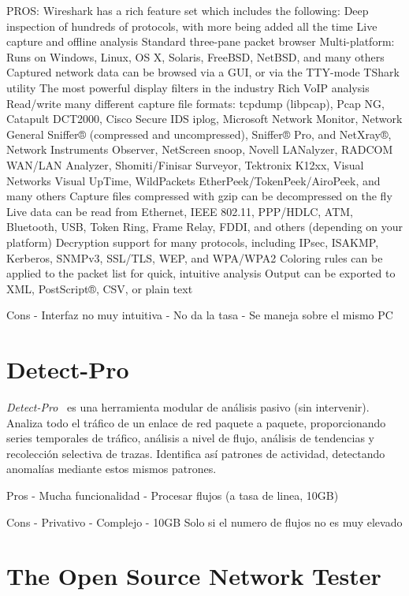 PROS:
Wireshark has a rich feature set which includes the following:
Deep inspection of hundreds of protocols, with more being added all the time
Live capture and offline analysis
Standard three-pane packet browser
Multi-platform: Runs on Windows, Linux, OS X, Solaris, FreeBSD, NetBSD, and many others
Captured network data can be browsed via a GUI, or via the TTY-mode TShark utility
The most powerful display filters in the industry
Rich VoIP analysis
Read/write many different capture file formats: tcpdump (libpcap), Pcap NG, Catapult DCT2000, Cisco Secure IDS iplog, Microsoft Network Monitor, Network General Sniffer® (compressed and uncompressed), Sniffer® Pro, and NetXray®, Network Instruments Observer, NetScreen snoop, Novell LANalyzer, RADCOM WAN/LAN Analyzer, Shomiti/Finisar Surveyor, Tektronix K12xx, Visual Networks Visual UpTime, WildPackets EtherPeek/TokenPeek/AiroPeek, and many others
Capture files compressed with gzip can be decompressed on the fly
Live data can be read from Ethernet, IEEE 802.11, PPP/HDLC, ATM, Bluetooth, USB, Token Ring, Frame Relay, FDDI, and others (depending on your platform)
Decryption support for many protocols, including IPsec, ISAKMP, Kerberos, SNMPv3, SSL/TLS, WEP, and WPA/WPA2
Coloring rules can be applied to the packet list for quick, intuitive analysis
Output can be exported to XML, PostScript®, CSV, or plain text

Cons
- Interfaz no muy intuitiva
- No da la tasa
- Se maneja sobre el mismo PC

\section{Detect-Pro\label{sec:eda:detectpro}}

\textit{Detect-Pro}~\cite{detectpro} es una herramienta modular de análisis pasivo (sin intervenir).
Analiza todo el tráfico de un enlace de red paquete a paquete, proporcionando series temporales de tráfico, análisis a nivel de flujo, análisis de tendencias y recolección selectiva de \glspl{traza}.
Identifica así patrones de actividad, detectando anomalías mediante estos mismos patrones.

Pros
- Mucha funcionalidad
- Procesar flujos (a tasa de linea, 10GB)

Cons
- Privativo
- Complejo
- 10GB Solo si el numero de flujos no es muy elevado

\section{The Open Source Network Tester\label{sec:eda:osnt}}

